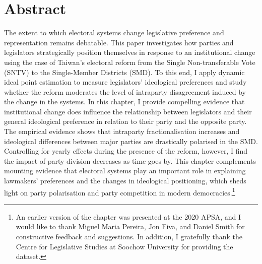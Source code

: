
\section*{\centering Abstract}
\small The extent to which electoral systems change legislative preference and representation remains debatable. This paper investigates how parties and legislators strategically position themselves in response to an institutional change using the case of Taiwan's electoral reform from the Single Non-transferable Vote (SNTV) to the Single-Member Districts (SMD). To this end, I apply dynamic ideal point estimation to measure legislators' ideological preferences and study whether the reform moderates the level of intraparty disagreement induced by the change in the systems. In this chapter, I provide compelling evidence that institutional change does influence the relationship between legislators and their general ideological preference in relation to their party and the opposite party. The empirical evidence shows that intraparty fractionalisation increases and ideological differences between major parties are drastically polarised in the SMD. Controlling for yearly effects during the presence of the reform, however, I find the impact of party division decreases as time goes by. This chapter complements mounting evidence that electoral systems play an important role in explaining lawmakers' preferences and the changes in ideological positioning, which sheds light on party polarisation and party competition in modern democracies.\footnote{An earlier version of the chapter was presented at the 2020 APSA, and I would like to thank Miguel Maria Pereira, Jon Fiva, and Daniel Smith for constructive feedback and suggestions. In addition, I gratefully thank the Centre for Legislative Studies at Soochow University for providing the dataset.}

\clearpage

